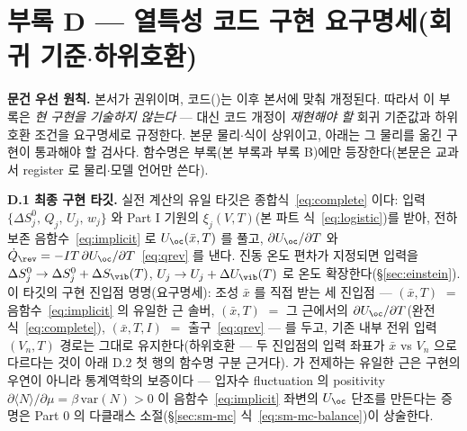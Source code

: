 \section*{부록 D --- 열특성 코드 구현 요구명세(회귀 기준$\cdot$하위호환)}
\label{sec:codemap-thermal}

\textbf{문건 우선 원칙.} 본서가 권위이며, 코드()는 이후 본서에 맞춰 개정된다. 따라서 이
부록은 \emph{현 구현을 기술하지 않는다} --- 대신 코드 개정이 \emph{재현해야 할} 회귀 기준값과 하위호환 조건을
요구명세로 규정한다. 본문 물리$\cdot$식이 상위이고, 아래는 그 물리를 옮긴 구현이 통과해야 할 검사다. 함수명은
부록(본 부록과 부록 B)에만 등장한다(본문은 교과서 register 로 물리$\cdot$모델 언어만 쓴다).

\textbf{D.1 최종 구현 타깃.} 실전 계산의 유일 타깃은 종합식~\eqref{eq:complete} 이다: 입력
$\{\Delta S^0_j,\,Q_j,\,U_j,\,w_j\}$ 와 Part I 기원의 $\xi_j(V,T)$(본 파트 식~\eqref{eq:logistic})를 받아, 전하 보존
음함수~\eqref{eq:implicit} 로 $U_\oc(\bar x,T)$ 를 풀고, $\partial U_\oc/\partial T$ 와 $\dot Q_\rev=-IT\,\partial
U_\oc/\partial T$~\eqref{eq:qrev} 를 낸다. 진동 온도 편차가 지정되면 입력을 $\Delta S^0_j\to\Delta
S^0_j+\Delta S_\vib(T)$, $U_j\to U_j+\Delta U_\vib(T)$ 로 온도 확장한다(\S\ref{sec:einstein}).
이 타깃의 구현 진입점 명명(요구명세): 조성 $\bar x$ 를 직접 받는 세 진입점 ---
$(\bar x,T)$ $=$ 음함수~\eqref{eq:implicit} 의 유일한 근 솔버,
$(\bar x,T)$ $=$ 그 근에서의 $\partial U_\oc/\partial T$(완전식~\eqref{eq:complete}),
$(\bar x,T,I)$ $=$ 출구~\eqref{eq:qrev} --- 를 두고, 기존 내부 전위 입력
$(V_n,T)$ 경로는 그대로 유지한다(하위호환 --- 두 진입점의 입력 좌표가
$\bar x$ vs $V_n$ 으로 다르다는 것이 아래 D.2 첫 행의 함수명 구분 근거다).  가 전제하는
유일한 근은 구현의 우연이 아니라 통계역학의 보증이다 --- 입자수 fluctuation 의 positivity
$\partial\langle N\rangle/\partial\mu=\beta\,\mathrm{var}(N)>0$ 이 음함수~\eqref{eq:implicit} 좌변의 $U_\oc$
단조를 만든다는 증명은 Part 0 의 다클래스 소절(\S\ref{sec:sm-mc} 식~\eqref{eq:sm-mc-balance})이 상술한다.


